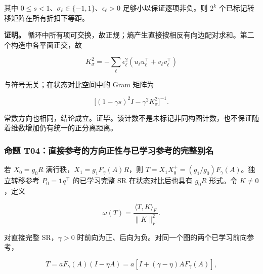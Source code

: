 \documentclass[11pt,a4paper]{article}
\begin{document}
其中 \(0\le s<1\)、\(\sigma_\ell\in\{-1,1\}\)、\(\epsilon_\ell>0\)
足够小以保证逐项非负。则 \(2^k\) 个已标记转移矩阵在所有折扣下等距。

\par
\noindent\begin{minipage}{\linewidth}

\textbf{证明。}
循环中所有项可交换，故正规；熵产生直接按相反有向边配对求和。第二个构造中各平面正交，故

\[
K_\sigma^2=-\sum_\ell\epsilon_\ell^2
(u_\ell u_\ell^\top+v_\ell v_\ell^\top)
\]

\end{minipage}\par

\par
\noindent\begin{minipage}{\linewidth}

与符号无关；在状态对比空间中的 Gram 矩阵为

\[
\big[(1-\gamma s)^2I-\gamma^2K_\sigma^2\big]^{-1}.
\]

\end{minipage}\par

常数方向也相同，结论成立。证毕。该计数不是未标记非同构图计数，也不保证随着维数增加仍有统一的正分离距离。

\subsubsection{命题
T04：直接参考的方向正性与已学习参考的完整别名}\label{ux547dux9898-t04ux76f4ux63a5ux53c2ux8003ux7684ux65b9ux5411ux6b63ux6027ux4e0eux5df2ux5b66ux4e60ux53c2ux8003ux7684ux5b8cux6574ux522bux540d}

\par
\noindent\begin{minipage}{\linewidth}

若 \(X_0=g_0R\) 满行秩，\(X_1=g_1F_\gamma(A)R\)，则
\(T=X_1X_0^+=(g_1/g_0)F_\gamma(A)\)。独立转移参考 \(P_0=\mathbf1q^\top\)
的已学习完整 SR 在状态对比后也具有 \(g_0R\) 形式。令 \(K\ne0\)，定义

\[
\omega(T)=\frac{\langle T,K\rangle_F}{\|K\|_F^2}.
\]

\end{minipage}\par

\par
\noindent\begin{minipage}{\linewidth}

对直接完整 SR，\(\gamma>0\)
时前向为正、后向为负。对同一个图的两个已学习前向参考，

\[
T=aF_\gamma(A)(I-\eta A)
=a[I+(\gamma-\eta)AF_\gamma(A)],
\]

\end{minipage}\par
\end{document}
